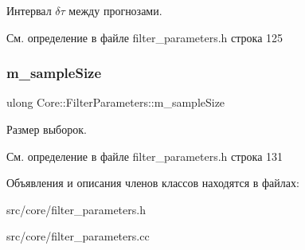 Интервал $\delta \tau$ между прогнозами. 

См. определение в файле filter\+\_\+parameters.\+h строка 125

\hypertarget{class_core_1_1_filter_parameters_a70abc1052c13fe0fb7f971229d7a1316}{}\label{class_core_1_1_filter_parameters_a70abc1052c13fe0fb7f971229d7a1316} 
\subsubsection{\texorpdfstring{m\+\_\+sample\+Size}{m\_sampleSize}}
{\footnotesize\ttfamily ulong Core\+::\+Filter\+Parameters\+::m\+\_\+sample\+Size\hspace{0.3cm}{\ttfamily [private]}}

Размер выборок. 

См. определение в файле filter\+\_\+parameters.\+h строка 131



Объявления и описания членов классов находятся в файлах\+:\begin{DoxyCompactItemize}
\item 
src/core/filter\+\_\+parameters.\+h\item 
src/core/filter\+\_\+parameters.\+cc\end{DoxyCompactItemize}
